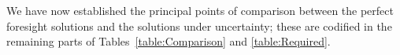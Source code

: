 \documentclass[BufferStockTheory]{subfiles}
\begin{document}
\begin{comment}
  
Finally, we are entitled to conclude that $\lim_{\mRat \uparrow \infty} \MPC(\mRat) = \MinMPC$ because, for any fixed value of $\pZero > 0$, and any fixed horizon $n$ it must be true that:
\begin{enumerate}
\item $\mathring{\cFunc}_{T-n}(\mRat) < \bar{\cFunc}_{T-n}$ for the reasons described in the section on the liquidity constrained model above
  \item As $\mRat \uparrow \infty$ the \textit{amount} by which $\bar{\cFunc}$ exceeds $\mathring{\cFunc}$ approaches zero.
\end{enumerate}

\end{comment}

We have now established the principal points of comparison between the perfect foresight solutions and the solutions under uncertainty; these are codified in the remaining parts of Tables~\ref{table:Comparison} and \ref{table:Required}.

\hypertarget{Factors-Defined-And-Compared}{}


\hypertarget{Sufficient-Conditions}{}
\hypertarget{Sufficient-Conditions-For-Nondegenerate-Solution}{}

\end{document}
